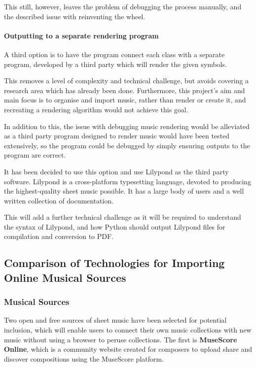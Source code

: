 This still, however, leaves the problem of debugging the process manually, and the described issue with reinventing the wheel.

\paragraph{Outputting to a separate rendering program}
A third option is to have the program connect each class with a separate program, developed by a third party which will render the given symbols.

This removes a level of complexity and technical challenge, but avoids covering a research area which has already been done. Furthermore, this project's aim and main focus is to organise and import music, rather than render or create it, and recreating a rendering algorithm would not achieve this goal.

In addition to this, the issue with debugging music rendering would be alleviated as a third party program designed to render music would have been tested extensively, so the program could be debugged by simply ensuring outputs to the program are correct.

It has been decided to use this option and use Lilypond as the third party software. Lilypond is a cross-platform typesetting language, devoted to producing the highest-quality sheet music possible. \parencite{Lilypond} It has a large body of users and a well written collection of documentation. 

This will add a further technical challenge as it will be required to understand the syntax of Lilypond, and how Python should output Lilypond files for compilation and conversion to PDF.

\subsection{Comparison of Technologies for Importing Online Musical Sources}
\subsubsection{Musical Sources}
Two open and free sources of sheet music have been selected for potential inclusion, which will enable users to connect their own music collections with new music without using a browser to peruse collections. The first is \textbf{MuseScore Online}, which is a community website created for composers to upload share and discover compositions using the MuseScore platform. \parencite{MuseShare}

